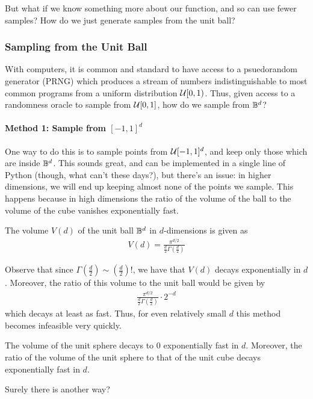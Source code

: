 But what if we know something more about our function, and so can use fewer samples? How do we just generate samples from the unit ball?
    \subsubsection{Sampling from the Unit Ball}
    With computers, it is common and standard to have access to a psuedorandom generator (PRNG) which produces a stream of numbers indistinguishable to most common programs from a uniform distribution $\mathcal{U}[0,1)$. Thus, given access to a randomness oracle to sample from $\mathcal{U}[0,1]$, how do we sample from $\mathbb{B}^d$?
    \paragraph{Method 1: Sample from $[-1,1]^d$}
    One way to do this is to sample points from $\mathcal{U}[-1,1]^d$, and keep only those which are inside $\mathbb{B}^d$. This sounds great, and can be implemented in a single line of Python (though, what can't these days?), but there's an issue: in higher dimensions, we will end up keeping almost none of the points we sample. This happens because in high dimensions the ratio of the volume of the ball to the volume of the cube vanishes exponentially fast.
    
    \begin{theorem}
    The volume $V(d)$ of the unit ball $\mathbb{B}^d$ in $d$-dimensions is given as
    \begin{align*}
        V(d) = \frac{\pi^{d/2}}{\frac{d}{2}\Gamma\left(\frac{d}{2}\right)}
    \end{align*}
    \end{theorem}
    Observe that since $\Gamma\left(\frac{d}{2}\right) \sim \left(\frac{d}{2}\right)!$, we have that $V(d)$ decays exponentially in $d$. Moreover, the ratio of this volume to the unit ball would be given by
    \begin{align*}
        \frac{\pi^{d/2}}{\frac{d}{2}\Gamma\left(\frac{d}{2}\right)} \cdot 2^{-d}
    \end{align*}
    which decays at least as fast. Thus, for even relatively small $d$ this method becomes infeasible very quickly.
    \begin{curse}
    The volume of the unit sphere decays to $0$ exponentially fast in $d$. Moreover, the ratio of the volume of the unit sphere to that of the unit cube decays exponentially fast in $d$.
    \end{curse}
    Surely there is another way?
    
